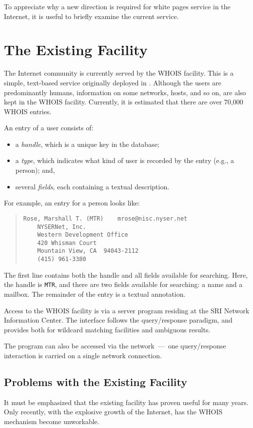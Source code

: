 To appreciate why a new direction is required for white pages service in the
Internet,
it is useful to briefly examine the current service.

\section	{The Existing Facility}
The Internet community is currently served by the WHOIS facility.
This is a simple, text-based service originally deployed in {}.
Although the users are predominantly humans,
information on some networks, hosts, and so on,
are also kept in the WHOIS facility.
Currently,
it is estimated that there are over 70,000 WHOIS entries.

An entry of a user consists of:
\begin{itemize}
\item	a {\em handle},
	which is a unique key in the database;

\item	a {\em type},
	which indicates what kind of user is recorded by the entry
	(e.g., a person);
	and,

\item	several {\em fields},
	each containing a textual description.
\end{itemize}
For example,
an entry for a person looks like:
\begin{quote}\small\begin{verbatim}
Rose, Marshall T. (MTR)    mrose@nisc.nyser.net
    NYSERNet, Inc.
    Western Development Office
    420 Whisman Court
    Mountain View, CA  94043-2112
    (415) 961-3380
\end{verbatim}\end{quote}
The first line contains both the handle and all fields available for searching.
Here,
the handle is \verb"MTR",
and there are two fields available for searching:
a name and a mailbox.
The remainder of the entry is a textual annotation.

Access to the WHOIS facility is via a server program residing at the SRI
Network Information Center.
The interface follows the query/response paradigm,
and provides both for wildcard matching facilities and ambiguous results.

The program can also be accessed via the network~---~one query/response
interaction is carried on a single network connection.

\subsection	{Problems with the Existing Facility}
It must be emphasized that the existing facility has proven useful for many
years.
Only recently,
with the explosive growth of the Internet,
has the WHOIS mechanism become unworkable.

